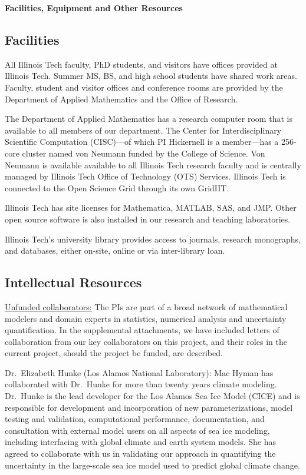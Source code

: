 \documentclass[11pt]{NSFamsart}
\begin{document}

\centerline{\textbf{\Large Facilities, Equipment and Other Resources}}

\bigskip

\subsection*{Facilities}
All Illinois Tech faculty, PhD students, and visitors have offices provided at Illinois Tech.  Summer 
MS, BS, and high school students have shared work areas.  Faculty, student and visitor 
offices and conference rooms are provided by the Department of Applied Mathematics and the Office of Research.

The Department of Applied Mathematics has a research computer room that is available to all 
members of our department.  The Center for Interdisciplinary Scientific Computation (CISC)---of which PI Hickernell is a member---has a 256-core cluster named von Neumann funded by the 
College of Science.  Von Neumann is 
available available to all Illinois Tech research faculty and is
centrally managed by Illinois Tech Office of Technology (OTS) Services.  Illinois Tech is connected 
to the Open Science Grid through its own GridIIT.  

Illinois Tech has site licenses for Mathematica, MATLAB, SAS, and JMP.  Other open source 
software is also installed in our research and teaching laboratories.

Illinois Tech's university library provides access to journals, research monographs, and 
databases, either on-site, online or via inter-library loan.

\subsection*{Intellectual Resources}
\phantom{a}

\underline{Unfunded collaborators:} The PIs are part of a broad network of mathematical modelers and domain experts in statistics, numerical analysis and uncertainty quantification.  In the supplemental attachments, we have included letters of collaboration from our key collaborators on this project, and their roles in the current project, should the project be funded, are described.

Dr.\ Elizabeth Hunke (Los Alamos National Laboratory): Mac Hyman has collaborated with Dr.\ Hunke for more than twenty years climate modeling.  Dr.\ Hunke is the lead developer for the Los Alamos Sea Ice Model (CICE) and is responsible for development and incorporation of new parameterizations, model testing and validation, computational performance, documentation, and consultation with external model users on all aspects of sea ice modeling, including interfacing with global climate and earth system models.  She has agreed to collaborate with us in validating our approach in quantifying the uncertainty in the large-scale sea ice model used to predict global climate change. 
\end{document}
